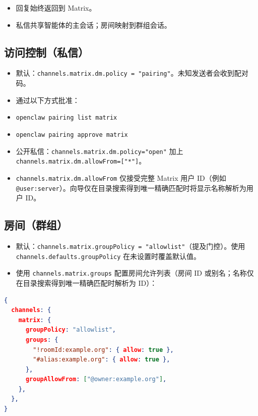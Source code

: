 \begin{itemize}
  \item 回复始终返回到 Matrix。
  \item 私信共享智能体的主会话；房间映射到群组会话。
\end{itemize}


\subsection{访问控制（私信）}


\begin{itemize}
  \item 默认：\texttt{channels.matrix.dm.policy = "pairing"}。未知发送者会收到配对码。
  \item 通过以下方式批准：
  \item \texttt{openclaw pairing list matrix}
  \item \texttt{openclaw pairing approve matrix }
  \item 公开私信：\texttt{channels.matrix.dm.policy="open"} 加上 \texttt{channels.matrix.dm.allowFrom=["*"]}。
  \item \texttt{channels.matrix.dm.allowFrom} 仅接受完整 Matrix 用户 ID（例如 \texttt{@user:server}）。向导仅在目录搜索得到唯一精确匹配时将显示名称解析为用户 ID。
\end{itemize}


\subsection{房间（群组）}


\begin{itemize}
  \item 默认：\texttt{channels.matrix.groupPolicy = "allowlist"}（提及门控）。使用 \texttt{channels.defaults.groupPolicy} 在未设置时覆盖默认值。
  \item 使用 \texttt{channels.matrix.groups} 配置房间允许列表（房间 ID 或别名；名称仅在目录搜索得到唯一精确匹配时解析为 ID）：
\end{itemize}


\begin{lstlisting}[language=json]
{
  channels: {
    matrix: {
      groupPolicy: "allowlist",
      groups: {
        "!roomId:example.org": { allow: true },
        "#alias:example.org": { allow: true },
      },
      groupAllowFrom: ["@owner:example.org"],
    },
  },
}
\end{lstlisting}


